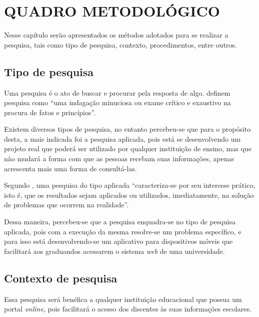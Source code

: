 \chapter{QUADRO METODOLÓGICO}

	\par Nesse capítulo serão apresentados os métodos adotados para se realizar a
pesquisa, tais como tipo de pesquisa, contexto, procedimentos, entre outros.

\section{Tipo de pesquisa}
	
	\par Uma pesquisa é o ato de buscar e procurar pela resposta de algo.
 definem pesquisa como “uma indagação minuciosa
ou exame crítico e exaustivo na procura de fatos e princípios”.

	\par Existem diversos tipos de pesquisa, no entanto percebeu-se que para o
propósito desta, a mais indicada foi a pesquisa aplicada, pois está se
desenvolvendo um projeto real que poderá ser utilizado por qualquer instituição
de ensino, mas que não mudará a forma com que as pessoas recebam suas
informações, apenas acrescenta mais uma forma de consultá-las.

	\par Segundo , uma pesquisa do tipo aplicada
“caracteriza-se por seu interesse prático, isto é, que os resultados sejam
aplicados ou utilizados, imediatamente, na solução de problemas que ocorrem na
realidade”.

	\par Dessa maneira, percebeu-se que a pesquisa enquadra-se no tipo de pesquisa
aplicada, pois com a execução da mesma resolve-se um problema específico, e para
isso está desenvolvendo-se um aplicativo para dispositivos móveis que facilitará aos
graduandos acessarem o sistema \textit{web} de uma universidade.

\section{Contexto de pesquisa}

	\par Essa pesquisa será benéfica a qualquer instituição educacional que possua
um portal \textit{online}, pois facilitará o acesso dos discentes às suas
informações escolares.

